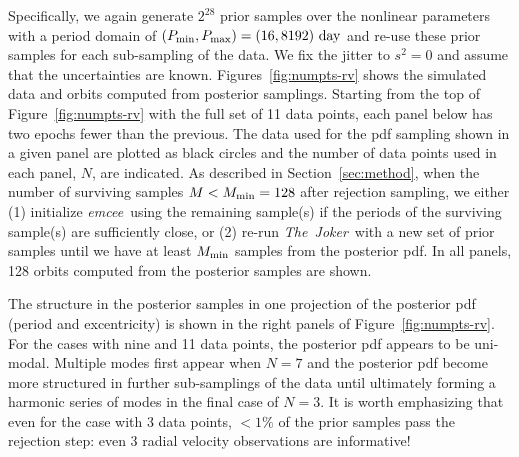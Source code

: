 \documentclass[manuscript, letterpaper]{aastex6}
\newcommand{\project}[1]{\textsl{#1}}
\newcommand{\samplername}{\project{The~Joker}}
\newcommand{\emcee}{\project{emcee}}
\newcommand{\sectionname}{Section}
\newcommand{\figname}{Figure}
\begin{document}
Specifically, we again generate $2^{28}$ prior samples over the nonlinear
parameters with a period domain of $(P_{\rm min}, P_{\rm max}) = (16, 8192)~{\rm
day}$ and re-use these prior samples for each sub-sampling of the data.
We fix the jitter to $s^2 = 0$ and assume that the uncertainties are known.
\figname s~\ref{fig:numpts-rv} shows the simulated data and orbits computed from
posterior samplings.
Starting from the top of \figname~\ref{fig:numpts-rv} with the full set of 11
data points, each panel below has two epochs fewer than the previous.
The data used for the pdf sampling shown in a given panel are plotted as black
circles and the number of data points used in each panel, $N$, are indicated.
As described in \sectionname~\ref{sec:method}, when the number of surviving
samples $M < M_{\rm min}=128$ after rejection sampling, we either (1) initialize
\emcee\ using the remaining sample(s) if the periods of the surviving sample(s)
are sufficiently close, or (2) re-run \samplername\ with a new set of prior
samples until we have at least $M_{\rm min}$ samples from the posterior pdf.
In all panels, 128 orbits computed from the posterior samples are shown.

The structure in the posterior samples in one projection of the posterior pdf
(period and excentricity) is
shown in the right panels of \figname~\ref{fig:numpts-rv}.
For the cases with nine and 11 data points, the posterior pdf appears to be
uni-modal.
Multiple modes first appear when $N=7$ and the posterior pdf become more
structured in further sub-samplings of the data until ultimately forming a
harmonic series of modes in the final case of $N=3$.
It is worth emphasizing that even for the case with 3 data points, $<1\%$ of the
prior samples pass the rejection step:
even 3 radial velocity observations are informative!
\end{document}

